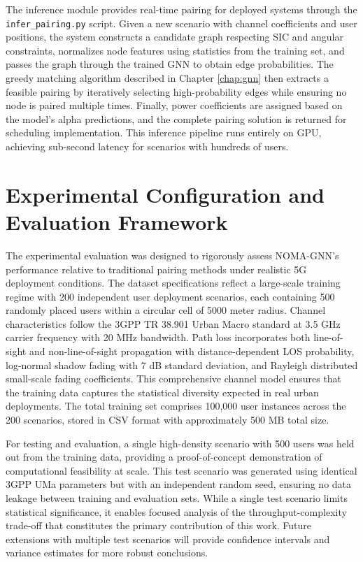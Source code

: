 The inference module provides real-time pairing for deployed systems through the \texttt{infer\_pairing.py} script. Given a new scenario with channel coefficients and user positions, the system constructs a candidate graph respecting SIC and angular constraints, normalizes node features using statistics from the training set, and passes the graph through the trained GNN to obtain edge probabilities. The greedy matching algorithm described in Chapter \ref{chap:gnn} then extracts a feasible pairing by iteratively selecting high-probability edges while ensuring no node is paired multiple times. Finally, power coefficients are assigned based on the model's alpha predictions, and the complete pairing solution is returned for scheduling implementation. This inference pipeline runs entirely on GPU, achieving sub-second latency for scenarios with hundreds of users.

\section{Experimental Configuration and Evaluation Framework}

The experimental evaluation was designed to rigorously assess NOMA-GNN's performance relative to traditional pairing methods under realistic 5G deployment conditions. The dataset specifications reflect a large-scale training regime with 200 independent user deployment scenarios, each containing 500 randomly placed users within a circular cell of 5000 meter radius. Channel characteristics follow the 3GPP TR 38.901 Urban Macro standard at 3.5 GHz carrier frequency with 20 MHz bandwidth. Path loss incorporates both line-of-sight and non-line-of-sight propagation with distance-dependent LOS probability, log-normal shadow fading with 7 dB standard deviation, and Rayleigh distributed small-scale fading coefficients. This comprehensive channel model ensures that the training data captures the statistical diversity expected in real urban deployments. The total training set comprises 100,000 user instances across the 200 scenarios, stored in CSV format with approximately 500 MB total size.

For testing and evaluation, a single high-density scenario with 500 users was held out from the training data, providing a proof-of-concept demonstration of computational feasibility at scale. This test scenario was generated using identical 3GPP UMa parameters but with an independent random seed, ensuring no data leakage between training and evaluation sets. While a single test scenario limits statistical significance, it enables focused analysis of the throughput-complexity trade-off that constitutes the primary contribution of this work. Future extensions with multiple test scenarios will provide confidence intervals and variance estimates for more robust conclusions.

